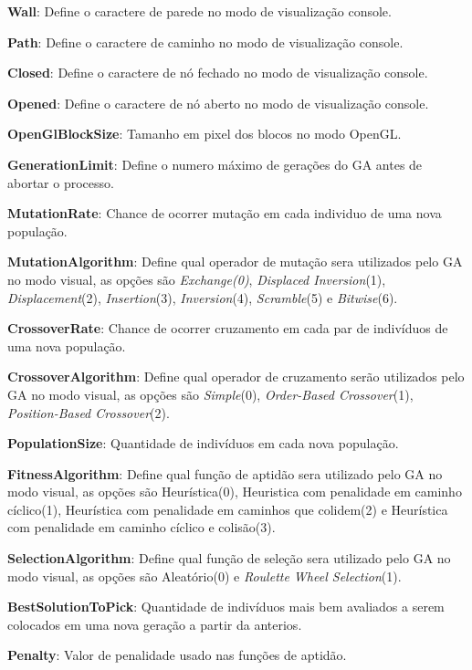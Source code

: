 \textbf{Wall}: Define o caractere de parede no modo de visualização console.

\textbf{Path}: Define o caractere de caminho no modo de visualização console.

\textbf{Closed}: Define o caractere de nó fechado no modo de visualização console.

\textbf{Opened}: Define o caractere de nó aberto no modo de visualização console.

\textbf{OpenGlBlockSize}: Tamanho em pixel dos blocos no modo OpenGL.


\textbf{GenerationLimit}: Define o numero máximo de gerações do GA antes de abortar o processo.

\textbf{MutationRate}: Chance de ocorrer mutação em cada individuo de uma nova população.

\textbf{MutationAlgorithm}:  Define qual operador de mutação sera utilizados pelo GA no modo visual, as opções são  \textit{Exchange(0)}, \textit{Displaced Inversion}(1), \textit{Displacement}(2), \textit{Insertion}(3), \textit{Inversion}(4), \textit{Scramble}(5) e \textit{Bitwise}(6).

\textbf{CrossoverRate}: Chance de ocorrer cruzamento em cada par de indivíduos de uma nova população.

\textbf{CrossoverAlgorithm}: Define qual operador de cruzamento serão utilizados pelo GA no modo visual, as opções são  \textit{Simple}(0), \textit{Order-Based Crossover}(1), \textit{Position-Based Crossover}(2).

\textbf{PopulationSize}: Quantidade de indivíduos em cada nova população.

\textbf{FitnessAlgorithm}: Define qual função de aptidão sera utilizado pelo GA no modo visual, as opções são Heurística(0), Heuristica com penalidade em caminho cíclico(1), Heurística com penalidade em caminhos que colidem(2) e Heurística com penalidade em caminho cíclico e colisão(3).

\textbf{SelectionAlgorithm}: Define qual função de seleção sera utilizado pelo GA no modo visual, as opções são  Aleatório(0) e \textit{Roulette Wheel Selection}(1).

\textbf{BestSolutionToPick}: Quantidade de indivíduos mais bem avaliados a serem colocados em uma nova geração a partir da anterios.

\textbf{Penalty}: Valor de penalidade usado nas funções de aptidão.
